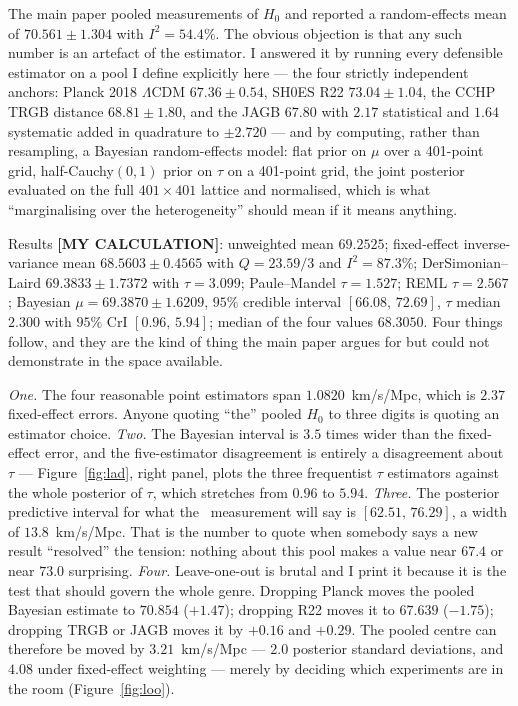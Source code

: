 \documentclass[11pt]{article}
\begin{document}
The main paper pooled measurements of $H_0$ and reported a random-effects mean of $70.561 \pm 1.304$
with $I^2 = 54.4\%$. The obvious objection is that any such number is an artefact of the estimator. I
answered it by running every defensible estimator on a pool I define explicitly here --- the four
strictly independent anchors: Planck 2018 $\Lambda$CDM $67.36\pm0.54$, SH0ES R22 $73.04\pm1.04$, the
CCHP TRGB distance $68.81\pm1.80$, and the JAGB $67.80$ with $2.17$ statistical and $1.64$ systematic
added in quadrature to $\pm2.720$ --- and by computing, rather than resampling, a Bayesian
random-effects model: flat prior on $\mu$ over a 401-point grid, half-Cauchy$(0,1)$ prior on
$\tau$ on a 401-point grid, the joint posterior evaluated on the full $401\times401$ lattice and
normalised, which is what ``marginalising over the heterogeneity'' should mean if it means anything.

Results \textbf{[MY CALCULATION]}: unweighted mean $69.2525$; fixed-effect inverse-variance mean
$68.5603\pm0.4565$ with $Q = 23.59/3$ and $I^2 = 87.3\%$; DerSimonian--Laird $69.3833\pm1.7372$ with
$\tau = 3.099$; Paule--Mandel $\tau = 1.527$; REML $\tau = 2.567$; Bayesian $\mu = 69.3870\pm1.6209$,
$95\%$ credible interval $[66.08,\,72.69]$, $\tau$ median $2.300$ with $95\%$ CrI $[0.96,\,5.94]$;
median of the four values $68.3050$. Four things follow, and they are the kind of thing the main paper
argues for but could not demonstrate in the space available.

\emph{One.} The four reasonable point estimators span $1.0820$~km/s/Mpc, which is $2.37$ fixed-effect
errors. Anyone quoting ``the'' pooled $H_0$ to three digits is quoting an estimator choice.
\emph{Two.} The Bayesian interval is $3.5$ times wider than the fixed-effect error, and the
five-estimator disagreement is entirely a disagreement about $\tau$ --- Figure~\ref{fig:lad}, right
panel, plots the three frequentist $\tau$ estimators against the whole posterior of $\tau$, which
stretches from $0.96$ to $5.94$. \emph{Three.} The posterior predictive interval for what the
\next\ measurement will say is $[62.51,\,76.29]$, a width of $13.8$~km/s/Mpc. That is the number to
quote when somebody says a new result ``resolved'' the tension: nothing about this pool makes a value
near $67.4$ or near $73.0$ surprising. \emph{Four.} Leave-one-out is brutal and I print it because it
is the test that should govern the whole genre. Dropping Planck moves the pooled Bayesian estimate to
$70.854$ ($+1.47$); dropping R22 moves it to $67.639$ ($-1.75$); dropping TRGB or JAGB moves it by
$+0.16$ and $+0.29$. The pooled centre can therefore be moved by $3.21$~km/s/Mpc --- $2.0$ posterior
standard deviations, and $4.08$ under fixed-effect weighting --- merely by deciding which experiments are in the room (Figure~\ref{fig:loo}).
\end{document}
